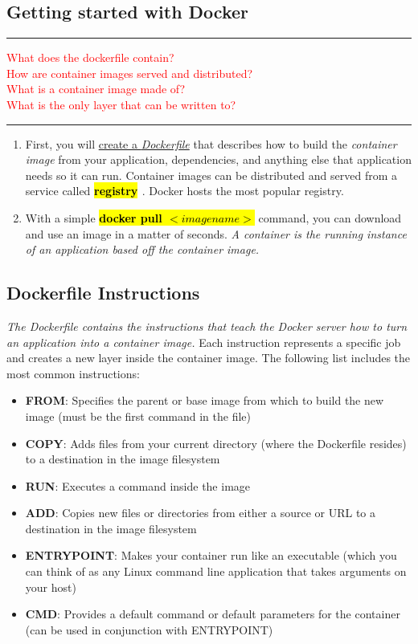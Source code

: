 \documentclass{article}
\begin{document}
\subsection{Getting started with Docker}
\noindent
{\color{red} \rule{\linewidth}{0.5mm}}
\textcolor{red}{What does the dockerfile contain?} \\
\textcolor{red}{How are container images served and distributed?} \\
\textcolor{red}{What is a container image made of?} \\
\textcolor{red}{What is the only layer that can be written to?} \\
\noindent
{\color{red} \rule{\linewidth}{0.5mm}}
\begin{enumerate}
    \item First, you will \underline{ create a \textit{Dockerfile}} that describes how to build the \textit{container image} from your application, dependencies, and anything else that application needs so it can run. Container images can be distributed and served from a service called \textbf{\textcolor{red}{\hl{registry }}}. Docker hosts the most popular registry. 
    \item With a simple \textbf{\textcolor{red}{\hl{docker pull   $<imagename>$}}} command, you can download and use an image in a matter of seconds. \textit{A container is the running instance of an application based off the container image.}
\end{enumerate}
\subsection{Dockerfile Instructions}
\textcolor{PineGreen} {\textit{The Dockerfile contains the instructions that teach the Docker server how to turn an application into a container image.}} Each instruction represents a specific job and creates a new layer inside the container image. The following list includes the most common instructions: 
\begin{itemize}
\color{blue}
\item \textbf{FROM}: Specifies the parent or base image from which to build the new image (must be the first command in the file)
\item \textbf{COPY}: Adds files from your current directory (where the Dockerfile resides) to a destination in the image filesystem
\item \textbf{RUN}:  Executes a command inside the image
\item \textbf{ADD}: Copies new files or directories from either a source or URL to a destination in the image filesystem
\item \textbf{ENTRYPOINT}: Makes your container run like an executable (which you can think of as any Linux command line application that takes arguments on your host)
\item \textbf{CMD}: Provides a default command or default parameters for the container (can be used in conjunction with ENTRYPOINT)

\end{itemize}
\end{document}
